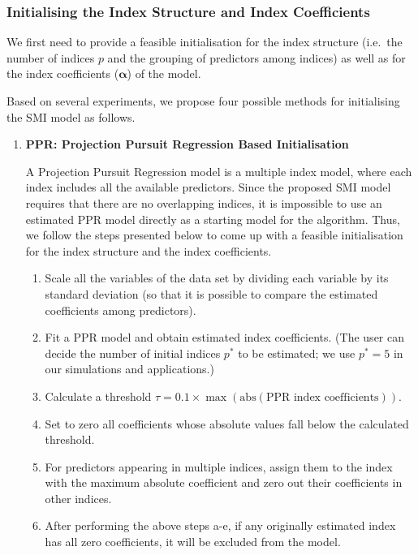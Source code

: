 \documentclass[
  11pt,
  a4paper,
]{article}
\providecommand{\tightlist}{%
  \setlength{\itemsep}{0pt}\setlength{\parskip}{0pt}}\usepackage{longtable,booktabs,array}
\begin{document}
\subsubsection{Initialising the Index Structure and Index
Coefficients}\label{sec-step1}

We first need to provide a feasible initialisation for the index
structure (i.e.~the number of indices \(p\) and the grouping of
predictors among indices) as well as for the index coefficients
(\(\bm{\alpha}\)) of the model.

Based on several experiments, we propose four possible methods for
initialising the SMI model as follows.

\begin{enumerate}
\def\labelenumi{\arabic{enumi}.}
\item
  \textbf{PPR: Projection Pursuit Regression Based Initialisation}

  A Projection Pursuit Regression model \autocite{Friedman1981} is a
  multiple index model, where each index includes all the available
  predictors. Since the proposed SMI model requires that there are no
  overlapping indices, it is impossible to use an estimated PPR model
  directly as a starting model for the algorithm. Thus, we follow the
  steps presented below to come up with a feasible initialisation for
  the index structure and the index coefficients.

  \begin{enumerate}
  \def\labelenumii{\alph{enumii}.}
  \tightlist
  \item
    Scale all the variables of the data set by dividing each variable by
    its standard deviation (so that it is possible to compare the
    estimated coefficients among predictors).
  \item
    Fit a PPR model and obtain estimated index coefficients. (The user
    can decide the number of initial indices \(p^*\) to be estimated; we
    use \(p^* = 5\) in our simulations and applications.)
  \item
    Calculate a threshold
    \(\tau = 0.1 \times \max(\mathrm{abs}(\text{PPR index coefficients}))\).
  \item
    Set to zero all coefficients whose absolute values fall below the
    calculated threshold.
  \item
    For predictors appearing in multiple indices, assign them to the
    index with the maximum absolute coefficient and zero out their
    coefficients in other indices.
  \item
    After performing the above steps a-e, if any originally estimated
    index has all zero coefficients, it will be excluded from the model.
  \end{enumerate}


\end{enumerate}
\end{document}
